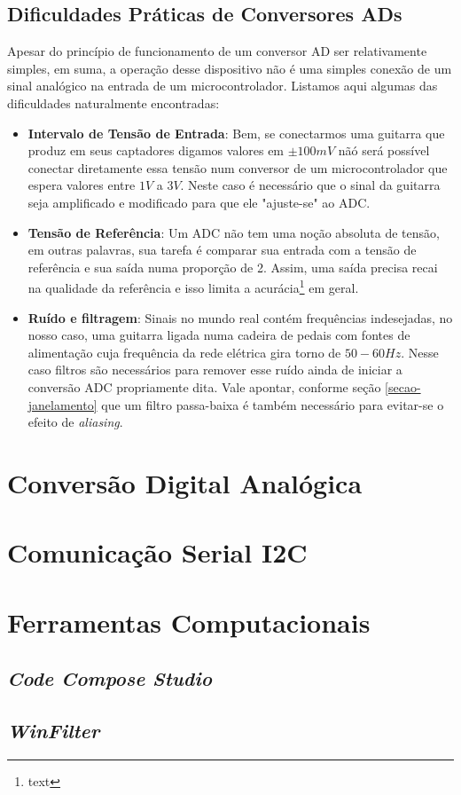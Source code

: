 	\subsection{Dificuldades Práticas de Conversores ADs}
		
		Apesar do princípio de funcionamento de um conversor AD ser relativamente simples, em suma, a operação desse dispositivo não é uma simples conexão de um sinal analógico na entrada de um microcontrolador. Listamos aqui algumas das dificuldades naturalmente encontradas:
		
		\begin{itemize}
			\item \textbf{Intervalo de Tensão de Entrada}: Bem, se conectarmos uma guitarra que produz em seus captadores digamos valores em $\pm 100 mV$ nãó será possível conectar diretamente essa tensão num conversor de um microcontrolador que espera valores entre $1V$ a $3V$. Neste caso é necessário que o sinal da guitarra seja amplificado e modificado para que ele "ajuste-se" ao ADC.
			
			\item \textbf{Tensão de Referência}: Um ADC não tem uma noção absoluta de tensão, em outras palavras, sua tarefa é comparar sua entrada com a tensão de referência e sua saída numa proporção de 2. Assim, uma saída precisa recai na qualidade da referência e isso limita a acurácia\footnote{text} em geral.
			
			\item  \textbf{Ruído e filtragem}: Sinais no mundo real contém frequências indesejadas, no nosso caso, uma guitarra ligada numa cadeira de pedais com fontes de alimentação cuja frequência da rede elétrica gira torno de $50-60Hz$. Nesse caso filtros são necessários para remover esse ruído ainda de iniciar a conversão ADC propriamente dita. Vale apontar, conforme seção \ref{secao-janelamento} que um filtro passa-baixa é também necessário para evitar-se o efeito de \textit{aliasing}.
		\end{itemize}
			
			

\section{Conversão Digital Analógica}

\section{Comunicação Serial I2C}
	
\section{Ferramentas Computacionais}

	\subsection{\textit{Code Compose Studio}}
	
	\subsection{\textit{WinFilter}}
